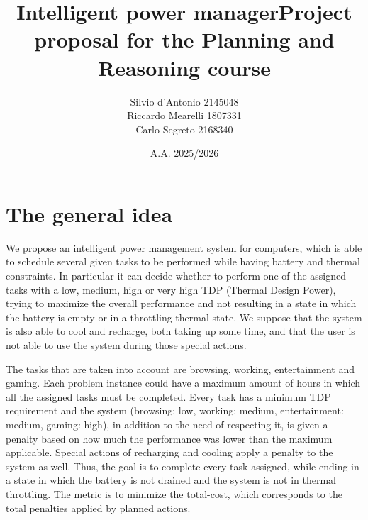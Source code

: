 \documentclass[12pt]{article}
\begin{document}
\author{Silvio d'Antonio 2145048\\ Riccardo Mearelli 1807331 \\Carlo Segreto 2168340}
\title{Intelligent power manager\medbreak \normalsize Project proposal for the Planning and Reasoning course}
\date{A.A. 2025/2026}
\maketitle
\newpage
\tableofcontents
\newpage

\section{The general idea}
We propose an intelligent power management system for computers, which is able to schedule several given tasks to be performed while having battery and thermal constraints. In particular it can decide whether to perform one of the assigned tasks with a low, medium, high or very high TDP (Thermal Design Power), trying to maximize the overall performance and not resulting in a state in which the battery is empty or in a throttling thermal state. We suppose that the system is also able to cool and recharge, both taking up some time, and that the user is not able to use the system during those special actions.

The tasks that are taken into account are browsing, working, entertainment and gaming. Each problem instance could have a maximum amount of hours in which all the assigned tasks must be completed. Every task has a minimum TDP requirement and the system (browsing: low, working: medium, entertainment: medium, gaming: high), in addition to the need of respecting it, is given a penalty based on how much the performance was lower than the maximum applicable. Special actions of recharging and cooling apply a penalty to the system as well.
Thus, the goal is to complete every task assigned, while ending in a state in which the battery is not drained and the system is not in thermal throttling. The metric is to minimize the total-cost, which corresponds to the total penalties applied by planned actions.
\end{document}
